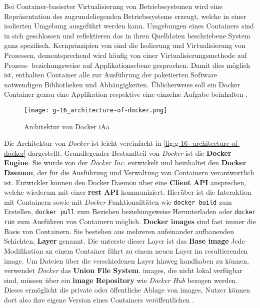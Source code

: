 Bei Container-basierter Virtualisierung von Betriebssystemen wird eine Repräsentation des zugrundeliegenden Betriebssystems erzeugt, welche in einer isolierten Umgebung ausgeführt werden kann. Umgebungen eines Containers sind in sich geschlossen und reflektieren das in ihren Quelldaten beschriebene System ganz spezifisch. Kernprinzipien von  sind die Isolierung und Virtualisierung von Prozessen, dementsprechend wird häufig von einer Virtualisierungsmethode auf Prozess- beziehungsweise auf Applikationsebene gesprochen. Damit dies möglich ist, enthalten Container alle zur Ausführung der paketierten Software notwendigen Bibliotheken und Abhängigkeiten. Üblicherweise soll ein Docker Container genau eine Applikation respektive eine einzelne Aufgabe beinhalten \cite{014:Managing-Container-based-Software-Development-Environments}.

\begin{figure}[h]
    \centering
    \texttt{[image: g-16\_architecture-of-docker.png]}
    \caption{Architektur von Docker \acrshort{iAa} \citeauthor{021:Docker-Security-Threat-Model-and-Best-Practices}}
    \label{fig:g-16_architecture-of-docker}
\end{figure}

Die Architektur von \textit{Docker} ist leicht vereinfacht in \autoref{fig:g-16_architecture-of-docker} dargestellt. Grundlegender Bestandteil von \textit{Docker} ist die \textbf{Docker Engine}. Sie wurde von der \textit{Docker Inc.} entwickelt und beinhaltet den \textbf{Docker Daemon}, der für die Ausführung und Verwaltung von Containern verantwortlich ist. Entwickler können den Docker Daemon über eine \textbf{Client API} ansprechen, welche wiederum mit einer \textbf{\Gls{rest} API} kommuniziert. Hierüber ist die Interaktion mit Containern sowie mit \textit{Docker} Funktionalitäten wie \texttt{docker build} zum Erstellen, \texttt{docker pull} zum Beziehen beziehungsweise Herunterladen oder \texttt{docker run} zum Ausführen von Containern möglich. \textbf{Docker \Glspl{image}} sind fast immer die Basis von Containern. Sie bestehen aus mehreren aufeinander aufbauenden Schichten, \textbf{Layer} genannt. Die unterste dieser Layer ist das \textbf{Base \Gls{image}} Jede Modifikation an einem Container führt zu einem neuen Layer im resultierenden \Gls{image}. Um Dateien über die verschiedenen Layer hinweg handhaben zu können, verwendet \textit{Docker} das \textbf{Union File System}. \Glspl{image}, die nicht lokal verfügbar sind, müssen über ein \textbf{\Gls{image} Repository} wie \textit{Docker Hub} bezogen werden. Dieses ermöglicht die private oder öffentliche Ablage von \Glspl{image}, Nutzer können dort also ihre eigene Version eines Containers veröffentlichen \cite{021:Docker-Security-Threat-Model-and-Best-Practices}.

